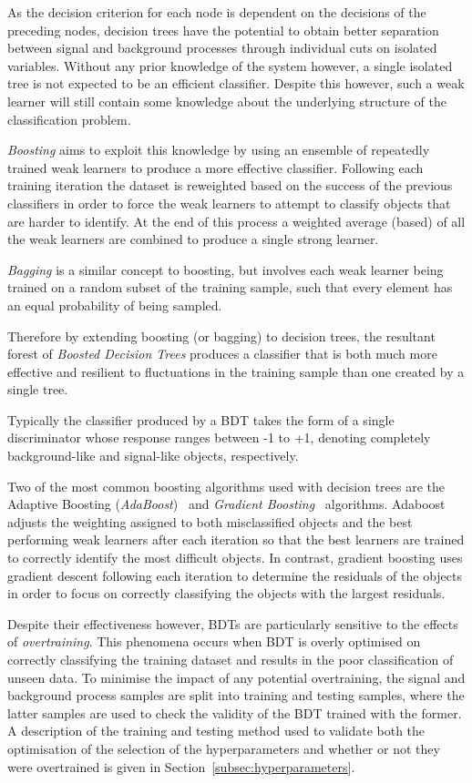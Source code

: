 As the decision criterion for each node is dependent on the decisions of the preceding nodes, decision trees have the potential to obtain better separation between signal and background processes through individual cuts on isolated variables.
Without any prior knowledge of the system however, a single isolated tree is not expected to be an efficient classifier.
Despite this however, such a weak learner will still contain some knowledge about the underlying structure of the classification problem.

\emph{Boosting} aims to exploit this knowledge by using an ensemble of repeatedly trained weak learners to produce a more effective classifier.
Following each training iteration the dataset is reweighted based on the success of the previous classifiers in order to force the weak learners to attempt to classify objects that are harder to identify.
At the end of this process a weighted average (based) of all the weak learners are combined to produce a single strong learner.

\emph{Bagging} is a similar concept to boosting, but involves each weak learner being trained on a random subset of the training sample, such that every element has an equal probability of being sampled.

Therefore by extending boosting (or bagging) to decision trees, the resultant forest of \emph{Boosted Decision Trees} produces a classifier that is both much more effective and resilient to fluctuations in the training sample than one created by a single tree.

Typically the classifier produced by a BDT takes the form of a single discriminator whose response ranges between -1 to +1, denoting completely background-like and signal-like objects, respectively.

Two of the most common boosting algorithms used with decision trees are the Adaptive Boosting (\emph{AdaBoost})~\cite{Friedman:additivelogistic} and \emph{Gradient Boosting}~\cite{Friedman:greedyfunction,Friedman:GradientBoosting} algorithms.
Adaboost adjusts the weighting assigned to both  misclassified objects and the best performing weak learners after each iteration so that the best learners are trained to correctly identify the most difficult objects.
In contrast, gradient boosting uses gradient descent following each iteration to determine the residuals of the objects in order to focus on correctly classifying the objects with the largest residuals.

Despite their effectiveness however, BDTs are particularly sensitive to the effects of \emph{overtraining}.
This phenomena occurs when BDT is overly optimised on correctly classifying the training dataset and results in the poor classification of unseen data.
To minimise the impact of any potential overtraining, the signal and background process samples are split into training and testing samples, where the latter samples are used to check the validity of the BDT trained with the former.
A description of the training and testing method used to validate both the optimisation of the selection of the hyperparameters and whether or not they were overtrained is given in Section~\ref{subsec:hyperparameters}.



